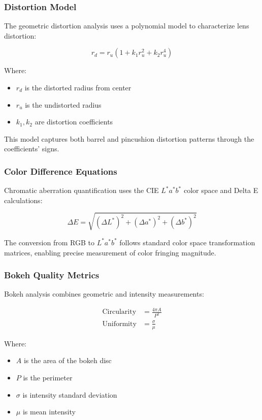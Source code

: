 \subsubsection{Distortion Model}
The geometric distortion analysis uses a polynomial model to characterize lens distortion:

\begin{equation}
r_d = r_u \left(1 + k_1 r_u^2 + k_2 r_u^4\right)
\end{equation}

Where:
\begin{itemize}
    \item \( r_d \) is the distorted radius from center
    \item \( r_u \) is the undistorted radius
    \item \( k_1, k_2 \) are distortion coefficients
\end{itemize}

This model captures both barrel and pincushion distortion patterns through the coefficients' signs.

\subsubsection{Color Difference Equations}
Chromatic aberration quantification uses the CIE \( L^*a^*b^* \) color space and Delta E calculations:

\begin{equation}
\Delta E = \sqrt{(\Delta L^*)^2 + (\Delta a^*)^2 + (\Delta b^*)^2}
\end{equation}

The conversion from RGB to \( L^*a^*b^* \) follows standard color space transformation matrices, enabling precise measurement of color fringing magnitude.

\subsubsection{Bokeh Quality Metrics}
Bokeh analysis combines geometric and intensity measurements:

\begin{align}
\text{Circularity} &= \frac{4\pi A}{P^2} \\
\text{Uniformity} &= \frac{\sigma}{\mu}
\end{align}

Where:
\begin{itemize}
    \item \( A \) is the area of the bokeh disc
    \item \( P \) is the perimeter
    \item \( \sigma \) is intensity standard deviation
    \item \( \mu \) is mean intensity
\end{itemize}


